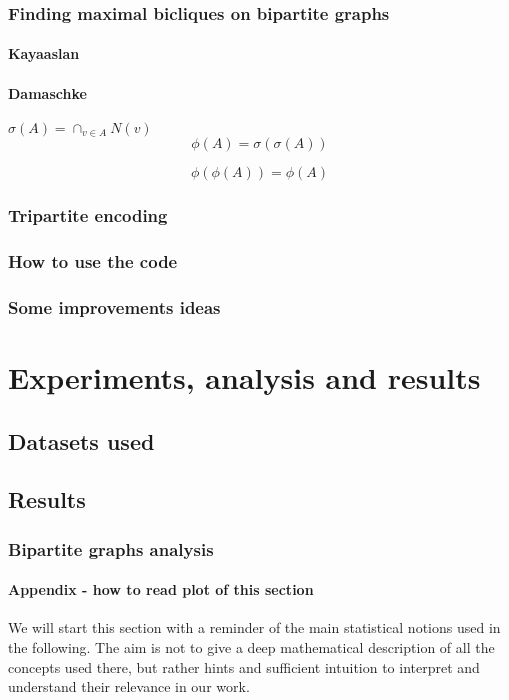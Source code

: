 \documentclass[table]{report}
\begin{document}
\subsection{Finding maximal bicliques on bipartite graphs}

\subsubsection{Kayaaslan}
\subsubsection{Damaschke}

$\sigma(A) = \cap_{v\in A} N(v)$
$$\phi(A) = \sigma(\sigma(A))$$

$$\phi(\phi(A)) = \phi(A)$$


\subsection{Tripartite encoding}
\subsection{How to use the code}
\subsection*{Some improvements ideas}

\chapter{Experiments, analysis and results}
\minitoc
\section{Datasets used}
\section{Results}
\subsection{Bipartite graphs analysis}

\subsubsection{Appendix - how to read plot of this section}

We will start this section with a reminder of the main statistical notions used in the following. The aim is not to give a deep mathematical description of all the concepts used there, but rather hints and sufficient intuition to interpret and understand their relevance in our work. 
\end{document}
